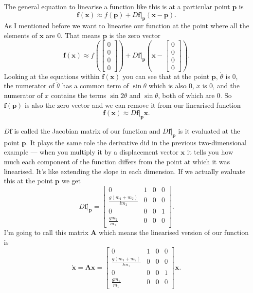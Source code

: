 \documentclass{article}
\renewcommand{\vec}[1]{\boldsymbol{\mathbf{#1}}}
\newcommand{\dvec}[1]{\dot{\vec{#1}}}
\begin{document}
The general equation to linearise a function like this is at a particular point $\vec{p}$ is \[\vec{f}(\vec{x}) \approx f(\vec{p}) + D \vec{f}|_{\vec{p}} (\vec{x} - \vec{p}).\] As I mentioned before we want to linearise our function at the point where all the elements of $\vec{x}$ are $0$. That means $\vec{p}$ is the zero vector \[\vec{f}(\vec{x}) \approx f \left( \begin{bmatrix}
      0 \\
      0 \\
      0 \\
      0
    \end{bmatrix} \right) + D \vec{f}|_{\vec{p}} \left( \vec{x} - \begin{bmatrix}
    0 \\
    0 \\
    0 \\
    0
\end{bmatrix} \right).\] Looking at the equations within $\vec{f}(\vec{x})$ you can see that at the point $\vec{p}$, $\dot{\theta}$ is $0$, the numerator of $\ddot{\theta}$ has a common term of $\sin \theta$ which is also $0$, $\dot{x}$ is $0$, and the numerator of $\ddot{x}$ contains the terms $\sin 2 \theta$ and $\sin \theta$, both of which are $0$. So $\vec{f}(\vec{p})$ is also the zero vector and we can remove it from our linearised function \[\vec{f}(\vec{x}) \approx D \vec{f}|_{\vec{p}} \vec{x}.\]

$D \vec{f}$ is called the Jacobian matrix of our function and $D \vec{f}|_{\vec{p}}$ is it evaluated at the point $\vec{p}$. It plays the same role the derivative did in the previous two-dimensional example — when you multiply it by a displacement vector $\vec{x}$ it tells you how much each component of the function differs from the point at which it was linearised. It's like extending the slope in each dimension. If we actually evaluate this at the point $\vec{p}$ we get \[D \vec{f}|_{\vec{p}} = \begin{bmatrix}
    0                           & 1 & 0 & 0 \\
    \frac{g (m_1 + m_2)}{l m_1} & 0 & 0 & 0 \\
    0                           & 0 & 0 & 1 \\
    \frac{g m_2}{m_1}           & 0 & 0 & 0
\end{bmatrix}.\] I'm going to call this matrix $\vec{A}$ which means the linearised version of our function is \[\dvec{x} = \vec{A} \vec{x} = \begin{bmatrix}
    0                           & 1 & 0 & 0 \\
    \frac{g (m_1 + m_2)}{l m_1} & 0 & 0 & 0 \\
    0                           & 0 & 0 & 1 \\
    \frac{g m_2}{m_1}           & 0 & 0 & 0
  \end{bmatrix} \vec{x}.\]
\end{document}
